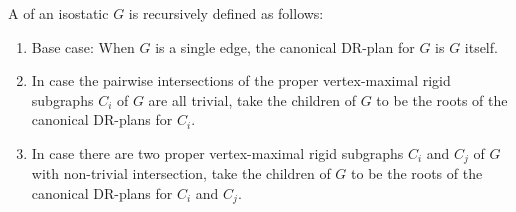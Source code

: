 \begin{definition}
\label{def:canonical_drp_rec}
    A  of an isostatic $G$ is recursively defined as follows:
    \begin{enumerate}
        \item Base case: When $G$ is a single edge, the canonical DR-plan for $G$ is $G$ itself.
        \item In case the pairwise intersections of the proper vertex-maximal rigid subgraphs $C_i$ of $G$  are all trivial, take the children of $G$ to be the roots of the canonical DR-plans for $C_i$.
        \item In case there are two proper vertex-maximal rigid subgraphs $C_i$ and $C_j$ of $G$ with non-trivial intersection, take the children of $G$ to be the roots of the canonical DR-plans for $C_i$ and $C_j$.
    \end{enumerate}
\end{definition}





